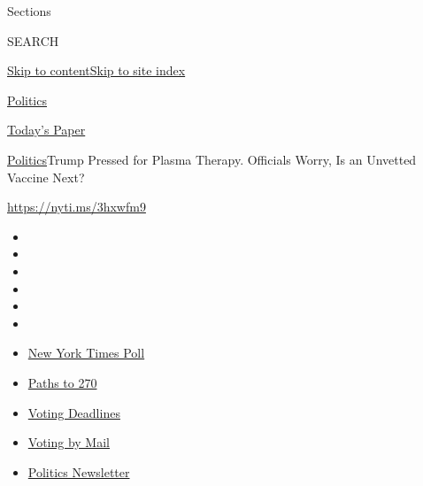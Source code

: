 Sections

SEARCH

\protect\hyperlink{site-content}{Skip to
content}\protect\hyperlink{site-index}{Skip to site index}

\href{https://www.nytimes3xbfgragh.onion/section/politics}{Politics}

\href{https://myaccount.nytimes3xbfgragh.onion/auth/login?response_type=cookie\&client_id=vi}{}

\href{https://www.nytimes3xbfgragh.onion/section/todayspaper}{Today's
Paper}

\href{/section/politics}{Politics}\textbar{}Trump Pressed for Plasma
Therapy. Officials Worry, Is an Unvetted Vaccine Next?

\url{https://nyti.ms/3hxwfm9}

\begin{itemize}
\item
\item
\item
\item
\item
\item
\end{itemize}

\begin{itemize}
\item
  \href{https://www.nytimes3xbfgragh.onion/2020/09/12/us/politics/biden-trump-poll-wisconsin-minnesota.html?action=click\&pgtype=Article\&state=default\&region=TOP_BANNER\&context=storylines_menu}{New
  York Times Poll}
\item
  \href{https://www.nytimes3xbfgragh.onion/interactive/2020/us/elections/election-states-biden-trump.html?action=click\&pgtype=Article\&state=default\&region=TOP_BANNER\&context=storylines_menu}{Paths
  to 270}
\item
  \href{https://www.nytimes3xbfgragh.onion/interactive/2019/us/elections/2020-presidential-election-calendar.html?action=click\&pgtype=Article\&state=default\&region=TOP_BANNER\&context=storylines_menu}{Voting
  Deadlines}
\item
  \href{https://www.nytimes3xbfgragh.onion/interactive/2020/08/31/us/politics/vote-by-mail-deadlines.html?action=click\&pgtype=Article\&state=default\&region=TOP_BANNER\&context=storylines_menu}{Voting
  by Mail}
\item
  \href{https://www.nytimes3xbfgragh.onion/newsletters/politics?action=click\&pgtype=Article\&state=default\&region=TOP_BANNER\&context=storylines_menu}{Politics
  Newsletter}
\end{itemize}

